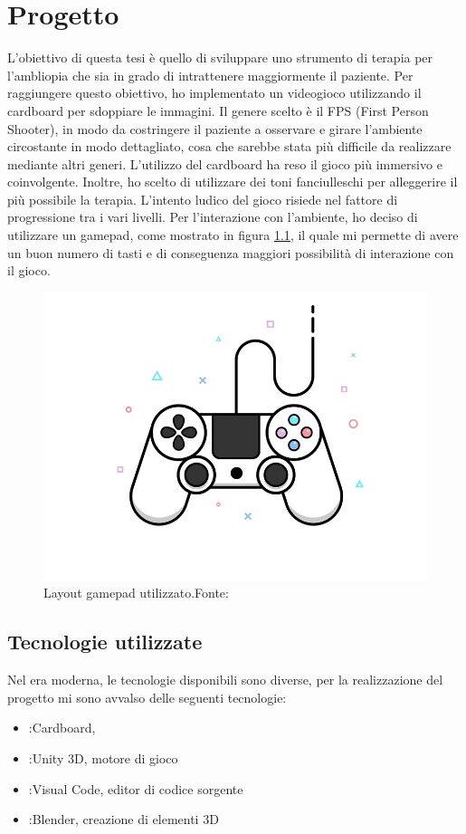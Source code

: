 \documentclass[
a4paper,
cleardoublepage=empty,
headings=twolinechapter,
numbers=autoenddot,
]{scrbook}
\begin{document}
    \chapter{Progetto}
     L'obiettivo di questa tesi è quello di sviluppare uno strumento di terapia per l'ambliopia che sia in grado di intrattenere maggiormente il paziente. Per raggiungere questo obiettivo, ho implementato un videogioco utilizzando il cardboard per sdoppiare le immagini. Il genere scelto è il FPS (First Person Shooter), in modo da costringere il paziente a osservare e girare l'ambiente circostante in modo dettagliato, cosa che sarebbe stata più difficile da realizzare mediante altri generi. L'utilizzo del cardboard ha reso il gioco più immersivo e coinvolgente. Inoltre, ho scelto di utilizzare dei toni fanciulleschi per alleggerire il più possibile la terapia. L'intento ludico del gioco risiede nel fattore di progressione tra i vari livelli. Per l'interazione con l'ambiente, ho deciso di utilizzare un gamepad, come mostrato in figura \ref{fig:gamepad}, il quale mi permette di avere un buon numero di tasti e di conseguenza maggiori possibilità di interazione con il gioco.
     \begin{figure}[H]
    	\centering
    	\includegraphics[width=0.8\linewidth]{image/gamepad}
    	\caption{Layout gamepad utilizzato.Fonte:\cite{controller_image}}
    	\label{fig:gamepad}
    \end{figure}
  
    \section{Tecnologie utilizzate}
    Nel era moderna, le tecnologie disponibili sono diverse, per la realizzazione del progetto mi sono avvalso delle seguenti tecnologie:
    \begin{itemize}
    	\item:Cardboard, 
    	\item:Unity 3D, motore di gioco
    	\item:Visual Code, editor di codice sorgente
    	\item:Blender, creazione di elementi 3D
    \end{itemize}
\end{document}
